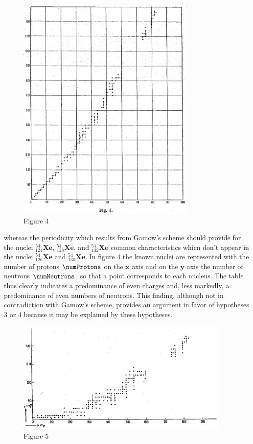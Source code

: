 \documentclass{article}
\newcommand{\var}[1]{\pmb{#1}}
\newcommand{\element}[1]{\textbf{#1}}
\newcommand{\isotope}[3]{
{{}^{#3}_{#2}\element{#1}}
}
\begin{document}
\begin{figure}[h!]
\centering
\includegraphics[width=250pt]{images/fig4}
{\caption*{Figure 4}}
\end{figure}
 whereas the periodicity which results from Gamow's scheme should provide for the nuclei $\isotope{Xe}{124}{54}$, $\isotope{Xe}{128}{54}$, and $\isotope{Xe}{132}{54}$ common characteristics whicn don't appear in the nuclei $\isotope{Xe}{126}{54}$ and $\isotope{Xe}{130}{54}$. In figure 4 the known nuclei are represented with the number of protons $\numProtons$ on the $\var{x}$ axis and on the $\var{y}$ axis the number of neutrons $\numNeutrons$, so that a point corresponds to each nucleus. The table thus clearly indicates a predominance of even charges and, less markedly, a predominance of even numbers of neutrons. This finding, although not in contradiction with Gamow's scheme, provides an argument in favor of hypotheses 3 or 4 because it may be explained by these hypotheses.

\begin{figure}[h!]
\centering
\includegraphics[width=300pt]{images/fig5}
{\caption*{Figure 5}}
\end{figure}
\end{document}
